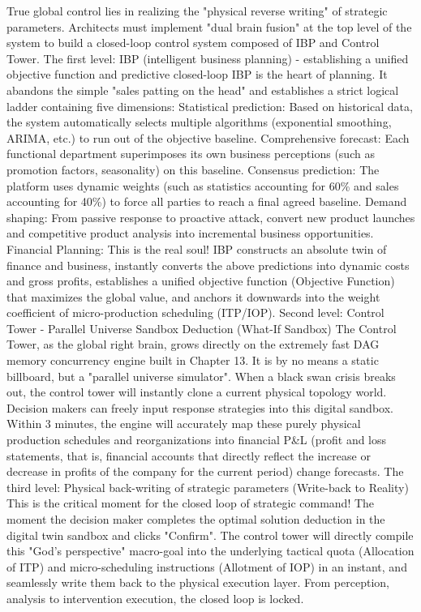 \documentclass[11pt,a4paper]{article}
\begin{document}
True global control lies in realizing the "physical reverse writing" of strategic parameters. Architects must implement "dual brain fusion" at the top level of the system to build a closed-loop control system composed of IBP and Control Tower. The first level: IBP (intelligent business planning) - establishing a unified objective function and predictive closed-loop IBP is the heart of planning. It abandons the simple "sales patting on the head" and establishes a strict logical ladder containing five dimensions: Statistical prediction: Based on historical data, the system automatically selects multiple algorithms (exponential smoothing, ARIMA, etc.) to run out of the objective baseline. Comprehensive forecast: Each functional department superimposes its own business perceptions (such as promotion factors, seasonality) on this baseline. Consensus prediction: The platform uses dynamic weights (such as statistics accounting for 60\% and sales accounting for 40\%) to force all parties to reach a final agreed baseline. Demand shaping: From passive response to proactive attack, convert new product launches and competitive product analysis into incremental business opportunities. Financial Planning: This is the real soul! IBP constructs an absolute twin of finance and business, instantly converts the above predictions into dynamic costs and gross profits, establishes a unified objective function (Objective Function) that maximizes the global value, and anchors it downwards into the weight coefficient of micro-production scheduling (ITP/IOP). Second level: Control Tower - Parallel Universe Sandbox Deduction (What-If Sandbox) The Control Tower, as the global right brain, grows directly on the extremely fast DAG memory concurrency engine built in Chapter 13. It is by no means a static billboard, but a "parallel universe simulator". When a black swan crisis breaks out, the control tower will instantly clone a current physical topology world. Decision makers can freely input response strategies into this digital sandbox. Within 3 minutes, the engine will accurately map these purely physical production schedules and reorganizations into financial P\&L (profit and loss statements, that is, financial accounts that directly reflect the increase or decrease in profits of the company for the current period) change forecasts. The third level: Physical back-writing of strategic parameters (Write-back to Reality) This is the critical moment for the closed loop of strategic command! The moment the decision maker completes the optimal solution deduction in the digital twin sandbox and clicks "Confirm". The control tower will directly compile this "God's perspective" macro-goal into the underlying tactical quota (Allocation of ITP) and micro-scheduling instructions (Allotment of IOP) in an instant, and seamlessly write them back to the physical execution layer. From perception, analysis to intervention execution, the closed loop is locked.
\end{document}
